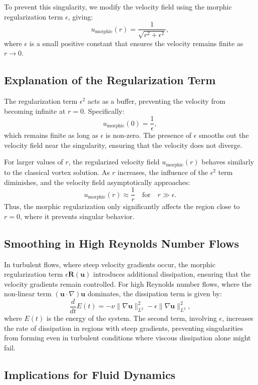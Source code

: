 \documentclass{article}
\begin{document}
To prevent this singularity, we modify the velocity field using the morphic regularization term \( \epsilon \), giving:
\[
u_{\text{morphic}}(r) = \frac{1}{\sqrt{r^2 + \epsilon^2}},
\]
where \( \epsilon \) is a small positive constant that ensures the velocity remains finite as \( r \to 0 \).

\subsection*{Explanation of the Regularization Term}

The regularization term \( \epsilon^2 \) acts as a buffer, preventing the velocity from becoming infinite at \( r = 0 \). Specifically:
\[
u_{\text{morphic}}(0) = \frac{1}{\epsilon},
\]
which remains finite as long as \( \epsilon \) is non-zero. The presence of \( \epsilon \) smooths out the velocity field near the singularity, ensuring that the velocity does not diverge.

For larger values of \( r \), the regularized velocity field \( u_{\text{morphic}}(r) \) behaves similarly to the classical vortex solution. As \( r \) increases, the influence of the \( \epsilon^2 \) term diminishes, and the velocity field asymptotically approaches:
\[
u_{\text{morphic}}(r) \approx \frac{1}{r} \quad \text{for} \quad r \gg \epsilon.
\]
Thus, the morphic regularization only significantly affects the region close to \( r = 0 \), where it prevents singular behavior.

\subsection*{Smoothing in High Reynolds Number Flows}

In turbulent flows, where steep velocity gradients occur, the morphic regularization term \( \epsilon \mathbf{R}(\mathbf{u}) \) introduces additional dissipation, ensuring that the velocity gradients remain controlled. For high Reynolds number flows, where the non-linear term \( (\mathbf{u} \cdot \nabla) \mathbf{u} \) dominates, the dissipation term is given by:
\[
\frac{d}{dt} E(t) = - \nu \|\nabla \mathbf{u}\|_{L^2}^2 - \epsilon \|\nabla \mathbf{u}\|_{L^2}^2,
\]
where \( E(t) \) is the energy of the system. The second term, involving \( \epsilon \), increases the rate of dissipation in regions with steep gradients, preventing singularities from forming even in turbulent conditions where viscous dissipation alone might fail.

\subsection*{Implications for Fluid Dynamics}
\end{document}
